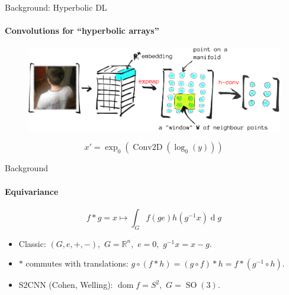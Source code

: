 \documentclass{beamer}
\begin{document}
\begin{frame}{Background: Hyperbolic DL}
    \framesubtitle{Convolutions for ``hyperbolic arrays''}

    \begin{figure}\centering
        \includegraphics[width=\linewidth]{art/image-convolutions-2019.pdf}
    \end{figure}

        \[ x' = \exp_0\left(
            \operatorname{Conv2D}\left(
                \log_0(y)
                \right)\right) \]
\end{frame}

\begin{frame}{Background}
    \framesubtitle{Equivariance}

    \[
        f \mathbin{*} g = x \mapsto \int_G f(g e) h(g^{-1} x) \operatorname{d}g
    \]

    \begin{itemize}
        \item Classic: \( (G, e, +, -), \) \( G=\mathbb{R}^n, \) \( e=0, \)
            \( g^{-1}x = x - g. \)
        \item \( * \) commutes with translations:
            \( g\circ (f \mathbin{*} h)
            = (g \circ f) \mathbin{*} h
            = f \mathbin{*} (g^{-1} \circ h). \)
        \item S2CNN (Cohen, Welling): \( \operatorname{dom}f = S^2, \)
            \( G = \operatorname{SO}(3) \).
    \end{itemize}
\end{frame}
\end{document}
